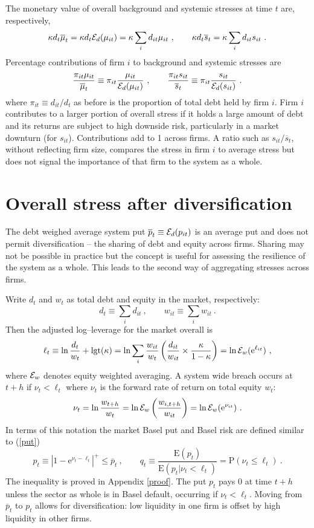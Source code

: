 \documentclass[authoryear]{elsarticle}
\newcommand{\logit}{\mathrm{lgt}}
\newcommand{\E}{\mathrm{E}}
\newcommand{\p}{\mathrm{P}}
\newcommand{\e}{\mathrm{e}}
\newcommand{\Ex}{{\cal E}}
\newcommand{\Exd}{\Ex_d}
\newcommand{\eref}[1]{(\ref{#1})}
\newcommand{\aref}[1]{Appendix \ref{#1}}
\newcommand{\cq}{\ , \qquad}
\newcommand{\be}[1]{\begin{equation}\label{#1}}
\newcommand{\ee}{\end{equation}}
\begin{document}
The monetary value of overall background and systemic stresses at time $t$ are, respectively,
$$
\kappa d_t\overline\mu_t = \kappa d_t\Exd(\mu_{it}) = \kappa\sum_i d_{it}\mu_{it}\cq \kappa d_t\overline s_t  = \kappa\sum_i d_{it}s_{it}\ .
$$
Percentage contributions of firm $i$ to background and systemic stresses are
$$
\frac{\pi_{it}\mu_{it}}{\overline \mu_t} \equiv \pi_{it}\frac{\mu_{it}}{\Exd(\mu_{it})}\cq \frac{\pi_{it}s_{it}}{\overline s_t} \equiv \pi_{it} \frac{s_{it}}{\Exd(s_{it})}\ .
$$
where $\pi_{it}\equiv d_{it}/d_t$ as before is the proportion of total debt held by firm $i$. Firm $i$ contributes to a larger portion of overall stress if it holds a large amount of debt and its returns are subject to high downside risk, particularly in a market downturn (for $s_{it}$). Contributions add to 1 across firms.  A ratio such as $s_{it}/\overline s_t$, without reflecting firm size, compares the stress in firm $i$ to average stress but does not signal the importance of that firm to the system as a whole.


\section{Overall stress after diversification}\label{aggregate1}

The debt weighed average system  put $\overline p_t\equiv\Ex_d(p_{it})$ is an average put and does not permit  diversification -- the  sharing of debt and equity across firms.   Sharing may not be possible in practice but the concept is useful for assessing the resilience of the system as a whole.   This leads to the second way of aggregating stresses across firms.

Write  $d_t$ and $w_t$ as total debt and equity in the market, respectively:
$$
d_t \equiv \sum_i d_{it}\cq w_{it} \equiv \sum_i w_{it}\ .
$$
Then the   adjusted log--leverage for the market overall is
$$
\ell_t \equiv  \ln \frac{d_t}{w_t} +\logit(\kappa) =  \ln \sum_i\frac{w_{it}}{w_t}\left(\frac{ d_{it}}{ w_{it}}\times \frac{\kappa}{1-\kappa}\right) = \ln \Ex_w(\e^{\ell_{it}}) \ ,
$$
where $\Ex_w$ denotes equity weighted averaging.  A system wide breach occurs at $t+h$ if
$
\nu_t < \ell_t
$
where $\nu_t$ is the forward rate of return on total equity $w_t$:
\be{ew}
 \nu_t =  \ln \frac{w_{t+h}}{w_t} = \ln\Ex_w\left(\frac{w_{i,t+h}}{w_{it}}\right) = \ln \Ex_w(\e^{\nu_{it}})\ .
\ee
In terms of this notation the market Basel put  and Basel risk are defined similar to \eref{put}
$$
p_t\equiv \left|1-\e^{\nu_t-\ell_t}\right|^+\le \overline p_t\cq q_t\equiv \frac{\E(p_t)}{\E(p_{t}|\nu_t<\ell_t)}=\p(\nu_t\le \ell_t) \ .
$$
The inequality is proved in  \aref{proof}.  The  put $p_t$ pays 0 at time $t+h$ unless the sector as whole is in Basel default, occurring if $\nu_t  <  \ell_t$. Moving from $\overline p_t$ to $p_t$  allows for diversification:   low liquidity  in one firm is offset by high liquidity  in other  firms.
\end{document}
